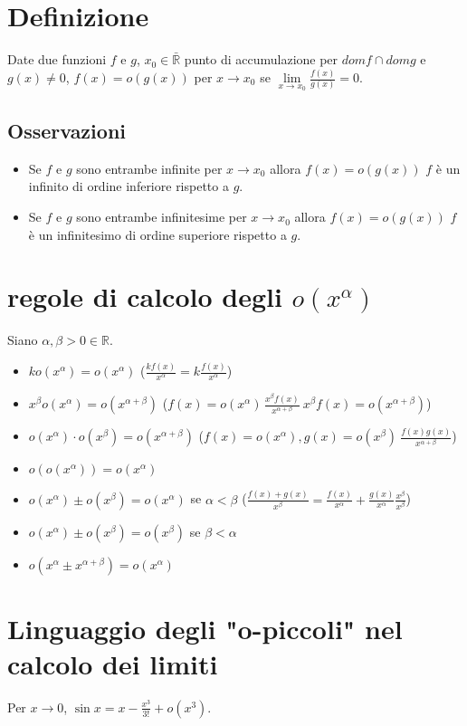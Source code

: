 \section{Definizione}
Date due funzioni $f$ e $g$, $x_0\in\mathbb{\bar{R}}$ punto di accumulazione per $domf\cap domg$ e $g(x)\neq 0$, $f(x)=o(g(x))$ per $x\rightarrow x_0$ se $\lim\limits_{x
\rightarrow x_0}\frac{f(x)}{g(x)}=0$.
\subsection{Osservazioni}
\begin{itemize}
\item Se $f$ e $g$ sono entrambe infinite per $x\rightarrow x_0$ allora $f(x)=o(g(x))$ $f$ \`e un infinito di ordine inferiore rispetto a $g$.
\item Se $f$ e $g$ sono entrambe infinitesime per $x\rightarrow x_0$ allora $f(x)=o(g(x))$ $f$ \`e un infinitesimo di ordine superiore rispetto a $g$.
\end{itemize}
\section{regole di calcolo degli $o(x^\alpha)$}
Siano $\alpha,\beta>0\in\mathbb{R}$.
\begin{itemize}
\item $ko(x^\alpha)=o(x^\alpha)$ ($\frac{kf(x)}{x^\alpha}=k\frac{f(x)}{x^\alpha}$)
\item $x^\beta o(x^\alpha)=o(x^{\alpha+\beta})$ ($f(x)=o(x^\alpha)\,\frac{x^\beta f(x)}{x^{\alpha+\beta}}\:x^\beta f(x)=o(x^{\alpha+\beta})$)
\item $o(x^\alpha)\cdot o(x^\beta)=o(x^{\alpha+\beta})$ ($f(x)=o(x^\alpha), g(x)=o(x^\beta)\:\frac{f(x)g(x)}{x^{\alpha+\beta}}$)
\item $o(o(x^\alpha))=o(x^\alpha)$
\item $o(x^\alpha)\pm o(x^\beta)=o(x^\alpha)$ se $\alpha<\beta$ ($\frac{f(x)+g(x)}{x^\beta}=\frac{f(x)}{x^\alpha}+\frac{g(x)}{x^\alpha}\frac{x^\beta}{x^\beta}$)
\item $o(x^\alpha)\pm o(x^\beta)=o(x^\beta)$ se $\beta<\alpha$
\item $o(x^\alpha\pm x^{\alpha+\beta})=o(x^\alpha)$
\end{itemize}
\section{Linguaggio degli "o-piccoli" nel calcolo dei limiti}
Per $x\rightarrow 0 $, $\sin x= x-\frac{x^3}{3!}+o(x^3)$.
